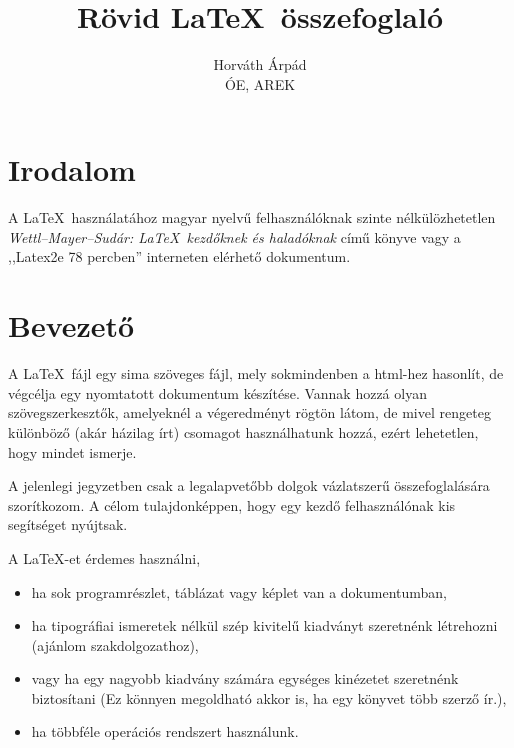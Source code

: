 \documentclass[a4paper]{article}
\begin{document}
\title{Rövid \LaTeX\ összefoglaló}
\author{Horváth Árpád\\ÓE, AREK}
\maketitle

\section*{Irodalom}
A \LaTeX\ használatához magyar nyelvű felhasználóknak szinte nélkülözhetetlen
\emph{ Wettl--Mayer--Sudár: \LaTeX\ kezdőknek és haladóknak} című könyve
vagy a ,,Latex2e 78 percben'' interneten elérhető dokumentum. 

\section*{Bevezető}

A \LaTeX\ fájl egy sima szöveges fájl, mely sokmindenben a html-hez hasonlít,
de végcélja egy nyomtatott dokumentum készítése.
Vannak hozzá olyan szövegszerkesztők, amelyeknél a végeredményt rögtön látom,
de mivel rengeteg különböző (akár házilag írt) csomagot használhatunk hozzá,
ezért lehetetlen, hogy mindet ismerje.

A jelenlegi jegyzetben csak a legalapvetőbb dolgok
vázlatszerű összefoglalására szorítkozom.
 A célom tulajdonképpen, hogy egy kezdő felhasználónak
kis segítséget nyújtsak.

\csakeloadas{\newpage}

A \LaTeX-et érdemes használni, 
\begin{itemize}
\item ha sok programrészlet, táblázat vagy képlet van a dokumentumban, 
\item ha tipográfiai ismeretek nélkül szép kivitelű kiadványt szeretnénk létrehozni
	(ajánlom szakdolgozathoz),
\item vagy ha egy nagyobb kiadvány számára egységes kinézetet szeretnénk biztosítani (Ez könnyen megoldható akkor is, ha  egy könyvet több szerző ír.),
\item ha többféle operációs rendszert használunk.
\end{itemize}

\csakeloadas{\newpage}
\end{document}
